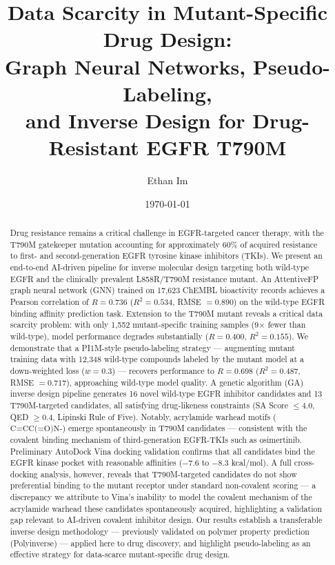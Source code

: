 \documentclass[11pt]{article}
\title{\textbf{Data Scarcity in Mutant-Specific Drug Design:\\
Graph Neural Networks, Pseudo-Labeling, \\
and Inverse Design for Drug-Resistant EGFR T790M}}
\author[1]{Ethan Im}
\affil[1]{Independent Researcher, Computational Drug Discovery \& Molecular Machine Learning}
\date{\today}
\begin{document}
\maketitle

\begin{abstract}
Drug resistance remains a critical challenge in EGFR-targeted cancer therapy,
with the T790M gatekeeper mutation accounting for approximately 60\% of acquired
resistance to first- and second-generation EGFR tyrosine kinase inhibitors (TKIs).
We present an end-to-end AI-driven pipeline for inverse molecular design targeting
both wild-type EGFR and the clinically prevalent L858R/T790M resistance mutant.
An AttentiveFP graph neural network (GNN) trained on 17,623 ChEMBL bioactivity
records achieves a Pearson correlation of $R = 0.736$ ($R^2 = 0.534$, RMSE $= 0.890$)
on the wild-type EGFR binding affinity prediction task.
Extension to the T790M mutant reveals a critical data scarcity problem:
with only 1,552 mutant-specific training samples (9$\times$ fewer than wild-type),
model performance degrades substantially ($R = 0.400$, $R^2 = 0.155$).
We demonstrate that a PI1M-style pseudo-labeling strategy ---
augmenting mutant training data with 12,348 wild-type compounds labeled by
the mutant model at a down-weighted loss ($w = 0.3$) ---
recovers performance to $R = 0.698$ ($R^2 = 0.487$, RMSE $= 0.717$),
approaching wild-type model quality.
A genetic algorithm (GA) inverse design pipeline generates 16 novel wild-type
EGFR inhibitor candidates and 13 T790M-targeted candidates, all satisfying
drug-likeness constraints (SA Score $\leq 4.0$, QED $\geq 0.4$, Lipinski Rule of Five).
Notably, acrylamide warhead motifs ($\text{C=CC(=O)N-}$) emerge spontaneously
in T790M candidates --- consistent with the covalent binding mechanism of
third-generation EGFR-TKIs such as osimertinib.
Preliminary AutoDock Vina docking validation confirms that all candidates
bind the EGFR kinase pocket with reasonable affinities ($-7.6$ to $-8.3$ kcal/mol).
A full cross-docking analysis, however, reveals that T790M-targeted candidates
do not show preferential binding to the mutant receptor under standard
non-covalent scoring --- a discrepancy we attribute to Vina's inability to
model the covalent mechanism of the acrylamide warhead these candidates
spontaneously acquired, highlighting a validation gap relevant to AI-driven
covalent inhibitor design.
Our results establish a transferable inverse design methodology ---
previously validated on polymer property prediction (Polyinverse) ---
applied here to drug discovery, and highlight pseudo-labeling as an effective
strategy for data-scarce mutant-specific drug design.
\end{abstract}
\end{document}
